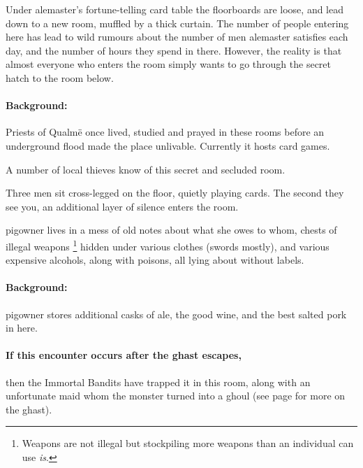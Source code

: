 \begin{multicols}{2}
\begin{boxtext}
\end{boxtext}

Under \gls{alemaster}'s fortune-telling card table the floorboards are loose, and lead down to a new room, muffled by a thick curtain.
The number of people entering here has lead to wild rumours about the number of men \gls{alemaster} satisfies each day, and the number of hours they spend in there.
However, the reality is that almost everyone who enters the room simply wants to go through the secret hatch to the room below.

\alemaster


\paragraph{Background:}
Priests of Qualm\"{e} once lived, studied and prayed in these rooms before an underground flood made the place unlivable.
Currently it hosts card games.

A number of local thieves know of this secret and secluded room.

\begin{boxtext}
  Three men sit cross-legged on the floor, quietly playing cards.
  The second they see you, an additional layer of silence enters the room.
\end{boxtext}


\label{pigRoom}

\Gls{pigowner} lives in a mess of old notes about what she owes to whom, chests of illegal weapons%
\footnote{Weapons are not illegal but stockpiling more weapons than an individual can use \emph{is}.}
hidden under various clothes (swords mostly), and various expensive alcohols, along with poisons, all lying about without labels.


\paragraph{Background:}
\Gls{pigowner} stores additional casks of ale, the good wine, and the best salted pork in here.

\paragraph{If this encounter occurs after the ghast escapes,}
then the Immortal Bandits have trapped it in this room, along with an unfortunate maid whom the monster turned into a ghoul (see page \pageref{ghastEscape} for more on the ghast).


\end{multicols}
